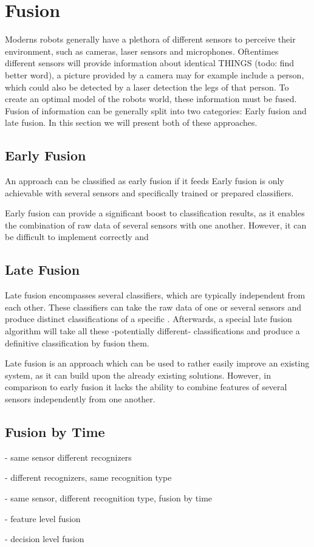 
\section{Fusion}
\label{related:fusion}
Moderns robots generally have a plethora of different sensors to perceive their environment, such as cameras, laser sensors and microphones.
Oftentimes different sensors will provide information about identical THINGS (todo: find better word), a picture provided by a camera may for example include a person, which could also be detected by a laser detection the legs of that person.
To create an optimal model of the robots world, these information must be fused.
Fusion of information can be generally split into two categories: Early fusion and late fusion.
In this section we will present both of these approaches.

\subsection{Early Fusion}
An approach can be classified as early fusion if it feeds
Early fusion is only achievable with several sensors and specifically trained or prepared classifiers.

Early fusion can provide a significant boost to classification results, as it enables the combination of raw data of several sensors with one another.
However, it can be difficult to implement correctly and 

\subsection{Late Fusion}
Late fusion encompasses several classifiers, which are typically independent from each other. 
These classifiers can take the raw data of one or several sensors and produce distinct classifications of a specific .
Afterwards, a special late fusion algorithm will take all these -potentially different- classifications and produce a definitive classification by fusion them.

Late fusion is an approach which can be used to rather easily improve an existing system, as it can build upon the already existing solutions.
However, in comparison to early fusion it lacks the ability to combine features of several sensors independently from one another.


\subsection{Fusion by Time}


- same sensor different recognizers 

- different recognizers, same recognition type

- same sensor, different recognition type, fusion by time



- feature level fusion


- decision level fusion